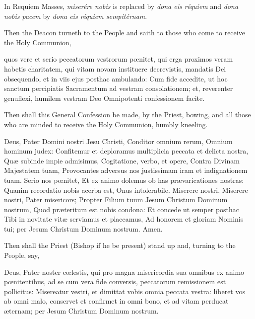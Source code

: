 \begin{rubric}
	In Requiem Masses, \emph{miserére nobis} is replaced by \emph{dona eis réquiem} and \emph{dona nobis pacem} by \emph{dona eis réquiem sempitérnam}.
\end{rubric}
\begin{rubric}
    Then the Deacon turneth to the People and saith to those who come to receive the Holy Communion,
\end{rubric}
 quos vere et serio peccatorum vestrorum p{\oe}nitet, qui erga proximos veram habetis charitatem, qui vitam novam instituere decrevistis, mandatis Dei obsequendo, et in viis ejus posthac ambulando: Cum fide accedite, ut hoc sanctum percipiatis Sacramentum ad vestram consolationem; et, reverenter genuflexi, humilem vestram Deo Omnipotenti confessionem facite.
\begin{rubric}
Then shall this General Confession be made, by the Priest, bowing, and all those who are minded to receive the Holy Communion, humbly kneeling.
\end{rubric}
 Deus, Pater Domini nostri Jesu Christi, Conditor omnium rerum, Omnium hominum judex: Confitemur et deploramus multiplicia peccata et delicta nostra, Quæ subinde impie admisimus, Cogitatione, verbo, et opere, Contra Divinam Majestatem tuam, Provocantes adversus nos justissimam iram et indignationem tuam. Serio nos pœnitet, Et ex animo dolemus ob has prævaricationes nostras: Quanim recordatio nobis acerba est, Onus intolerabile. Miserere nostri, Miserere nostri, Pater misericors; Propter Filium tuum Jesum Christum Dominum nostrum, Quod præteritum est nobis condona: Et concede ut semper posthac Tibi in novitate vitæ serviamus et placeamus, Ad honorem et gloriam Nominis tui; per Jesum Christum Dominum nostrum. Amen. 
\begin{rubric}
	Then shall the Priest (Bishop if he be present) stand up and, turning to the People, say,
\end{rubric}
 Deus, Pater noster cœlestis, qui pro magna misericordia sua omnibus ex animo pœnitentibus, ad se cum vera fide conversis, peccatorum remissionem est pollicitus: Misereatur vestri, et dimittat vobis {} omnia peccata vestra: liberet vos ab omni malo, conservet et confirmet in omni bono, et ad vitam perducat æternam; per Jesum Christum Dominum nostrum.

